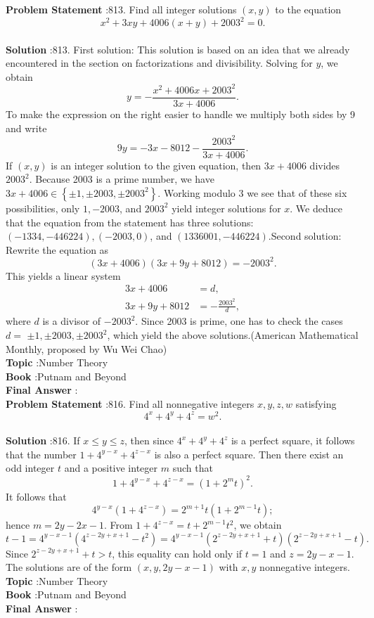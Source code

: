 \documentclass[10pt]{article}
\begin{document}
\textbf{Problem Statement} :813. Find all integer solutions $(x, y)$ to the equation$$ x^{2}+3 x y+4006(x+y)+2003^{2}=0 . $$\\
\textbf{Solution} :813. First solution: This solution is based on an idea that we already encountered in the section on factorizations and divisibility. Solving for $y$, we obtain$$ y=-\frac{x^{2}+4006 x+2003^{2}}{3 x+4006} . $$To make the expression on the right easier to handle we multiply both sides by 9 and write$$ 9 y=-3 x-8012-\frac{2003^{2}}{3 x+4006} . $$If $(x, y)$ is an integer solution to the given equation, then $3 x+4006$ divides $2003^{2}$. Because 2003 is a prime number, we have $3 x+4006 \in\left\{\pm 1, \pm 2003, \pm 2003^{2}\right\}$. Working modulo 3 we see that of these six possibilities, only $1,-2003$, and $2003^{2}$ yield integer solutions for $x$. We deduce that the equation from the statement has three solutions: $(-1334,-446224),(-2003,0)$, and $(1336001,-446224)$.Second solution: Rewrite the equation as$$ (3 x+4006)(3 x+9 y+8012)=-2003^{2} . $$This yields a linear system$$ \begin{aligned} 3 x+4006 &=d, \\ 3 x+9 y+8012 &=-\frac{2003^{2}}{d}, \end{aligned} $$where $d$ is a divisor of $-2003^{2}$. Since 2003 is prime, one has to check the cases $d=$ $\pm 1, \pm 2003, \pm 2003^{2}$, which yield the above solutions.(American Mathematical Monthly, proposed by Wu Wei Chao) \\
\textbf{Topic} :Number Theory\\
\textbf{Book} :Putnam and Beyond\\
\textbf{Final Answer} :\\


\textbf{Problem Statement} :816. Find all nonnegative integers $x, y, z, w$ satisfying$$ 4^{x}+4^{y}+4^{z}=w^{2} . $$\\
\textbf{Solution} :816. If $x \leq y \leq z$, then since $4^{x}+4^{y}+4^{z}$ is a perfect square, it follows that the number $1+4^{y-x}+4^{z-x}$ is also a perfect square. Then there exist an odd integer $t$ and a positive integer $m$ such that$$ 1+4^{y-x}+4^{z-x}=\left(1+2^{m} t\right)^{2} . $$It follows that$$ 4^{y-x}\left(1+4^{z-x}\right)=2^{m+1} t\left(1+2^{m-1} t\right) ; $$hence $m=2 y-2 x-1$. From $1+4^{z-x}=t+2^{m-1} t^{2}$, we obtain$$ t-1=4^{y-x-1}\left(4^{z-2 y+x+1}-t^{2}\right)=4^{y-x-1}\left(2^{z-2 y+x+1}+t\right)\left(2^{z-2 y+x+1}-t\right) . $$Since $2^{z-2 y+x+1}+t>t$, this equality can hold only if $t=1$ and $z=2 y-x-1$. The solutions are of the form $(x, y, 2 y-x-1)$ with $x, y$ nonnegative integers.\\
\textbf{Topic} :Number Theory\\
\textbf{Book} :Putnam and Beyond\\
\textbf{Final Answer} :\\
\end{document}
